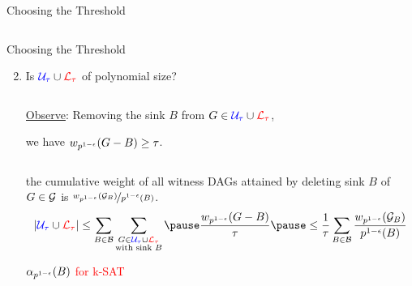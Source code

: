 \documentclass{beamer}
\def\spadding{\vspace{0.25cm}}
\def\r{\textcolor{red}}
\newcommand*{\eqdef}{\overset{.}{=}}
\begin{document}
\begin{frame}{Choosing the Threshold}
\begin{enumerate}
\begin{columns}[T]
\begin{column}{0.4\textwidth}
    \spadding
    
    \end{column}
    \begin{column}{0.12\textwidth}
    \centering
    \end{column}
    \begin{column}{0\textwidth}
    \end{column}
    \end{columns}
\end{enumerate}
\end{frame}

\begin{frame}{Choosing the Threshold}
\begin{enumerate}
    \setcounter{enumi}{1}
    \item Is $\U \cup \L$ of polynomial size?\pause\vspace{0.25em}
    
    \begin{columns}[T]
    \begin{column}{0.42\textwidth}
    \underline{Observe}: Removing the sink $B$ from $G \in \U \cup \L$,\par we have $w_{p^{1-\epsilon}}(G - B) \geq \tau$.\spadding
    
    \end{column}
    \begin{column}{0.1\textwidth}
    \centering\vspace{-2em}
    \end{column}
    \begin{column}{0\textwidth}
    \end{column}
    \end{columns}\pause\pause\pause\pause
    
    \follows the cumulative weight of all witness DAGs attained by deleting sink $B$ of $G \in \mathcal{G}$ is $\nicefrac{w_{p^{1-\epsilon}}(\mathcal{G}_B)}{p^{1-\epsilon}(B)}$.\pause\begin{align*}
        |\U \cup \L| &\leq \sum_{B \in \B} \sum_{\substack{G \in \U \cup \L \\ \text{with sink $B$}}} \pause\frac{\epsw(G - B)}{\tau} \pause\leq \frac{1}{\tau} \sum_{B \in \B} \frac{\epsw(\G_B)}{\epslaw(B)} \\
    \end{align*}\vspace{-2.5em}\pause
    
    \r{$\alpha_{p^{1-\epsilon}}(B)$ for k-SAT}
\end{enumerate}
\end{frame}
\end{document}

